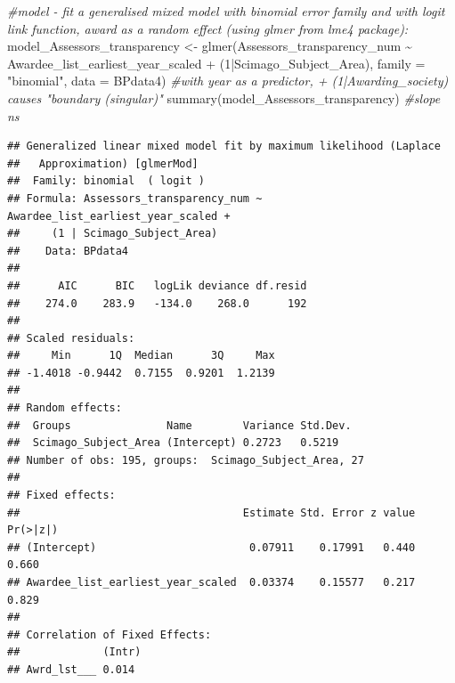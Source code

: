 \documentclass[
]{article}
\newenvironment{Shaded}{\begin{snugshade}}{\end{snugshade}}
\newcommand{\AttributeTok}[1]{\textcolor[rgb]{0.77,0.63,0.00}{#1}}
\newcommand{\CommentTok}[1]{\textcolor[rgb]{0.56,0.35,0.01}{\textit{#1}}}
\newcommand{\DecValTok}[1]{\textcolor[rgb]{0.00,0.00,0.81}{#1}}
\newcommand{\DocumentationTok}[1]{\textcolor[rgb]{0.56,0.35,0.01}{\textbf{\textit{#1}}}}
\newcommand{\FunctionTok}[1]{\textcolor[rgb]{0.00,0.00,0.00}{#1}}
\newcommand{\NormalTok}[1]{#1}
\newcommand{\OtherTok}[1]{\textcolor[rgb]{0.56,0.35,0.01}{#1}}
\newcommand{\SpecialCharTok}[1]{\textcolor[rgb]{0.00,0.00,0.00}{#1}}
\newcommand{\StringTok}[1]{\textcolor[rgb]{0.31,0.60,0.02}{#1}}
\begin{document}
\begin{Shaded}
\begin{Highlighting}[]
\CommentTok{\#model {-} fit a generalised mixed model with binomial error family and with logit link function, award as a random effect (using glmer from lme4 package):}
\NormalTok{model\_Assessors\_transparency }\OtherTok{\textless{}{-}} \FunctionTok{glmer}\NormalTok{(Assessors\_transparency\_num }\SpecialCharTok{\textasciitilde{}}\NormalTok{ Awardee\_list\_earliest\_year\_scaled }\SpecialCharTok{+}\NormalTok{ (}\DecValTok{1}\SpecialCharTok{|}\NormalTok{Scimago\_Subject\_Area), }\AttributeTok{family =} \StringTok{"binomial"}\NormalTok{, }\AttributeTok{data =}\NormalTok{ BPdata4) }\CommentTok{\#with year as a predictor, + (1|Awarding\_society) causes "boundary (singular)"}
\FunctionTok{summary}\NormalTok{(model\_Assessors\_transparency) }\CommentTok{\#slope ns}
\end{Highlighting}
\end{Shaded}

\begin{verbatim}
## Generalized linear mixed model fit by maximum likelihood (Laplace
##   Approximation) [glmerMod]
##  Family: binomial  ( logit )
## Formula: Assessors_transparency_num ~ Awardee_list_earliest_year_scaled +  
##     (1 | Scimago_Subject_Area)
##    Data: BPdata4
## 
##      AIC      BIC   logLik deviance df.resid 
##    274.0    283.9   -134.0    268.0      192 
## 
## Scaled residuals: 
##     Min      1Q  Median      3Q     Max 
## -1.4018 -0.9442  0.7155  0.9201  1.2139 
## 
## Random effects:
##  Groups               Name        Variance Std.Dev.
##  Scimago_Subject_Area (Intercept) 0.2723   0.5219  
## Number of obs: 195, groups:  Scimago_Subject_Area, 27
## 
## Fixed effects:
##                                   Estimate Std. Error z value Pr(>|z|)
## (Intercept)                        0.07911    0.17991   0.440    0.660
## Awardee_list_earliest_year_scaled  0.03374    0.15577   0.217    0.829
## 
## Correlation of Fixed Effects:
##             (Intr)
## Awrd_lst___ 0.014
\end{verbatim}

\begin{Shaded}
\end{Shaded}
\end{document}
